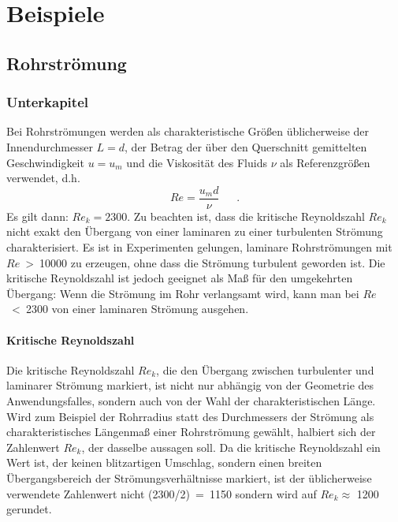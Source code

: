 \chapter{Beispiele}
\label{sec:Beispiele}
\section{Rohrströmung}
\label{sec:Rohrstroemung}
\subsection{Unterkapitel}
\label{sec:Unterkapitel}

Bei Rohrströmungen werden als charakteristische Größen üblicherweise der Innendurchmesser $L = d$, der Betrag der über den Querschnitt gemittelten Geschwindigkeit $u = u_m$ und die Viskosität des Fluids $\nu$ als Referenzgrößen verwendet, d.h.
\begin{equation}
	Re = \frac{u_m d}{\nu}  \ \ \ \ \ \ \ \mbox{.}
\end{equation}
Es gilt dann: $Re_k = 2300$.
Zu beachten ist, dass die kritische Reynoldszahl $Re_{k}$ nicht exakt den Übergang von einer laminaren zu einer turbulenten Strömung charakterisiert. Es ist in Experimenten gelungen, laminare Rohrströmungen mit $Re$ > 10000 zu erzeugen, ohne dass die Strömung turbulent geworden ist. Die kritische Reynoldszahl ist jedoch geeignet als Maß für den umgekehrten Übergang: Wenn die Strömung im Rohr verlangsamt wird, kann man bei $Re$ < 2300 von einer laminaren Strömung ausgehen. 
\subsubsection{Kritische Reynoldszahl}
\label{sec:KritischeReynoldszahl}
Die kritische Reynoldszahl $Re_k$, die den Übergang zwischen turbulenter und laminarer Strömung markiert, ist nicht nur abhängig von der Geometrie des Anwendungsfalles, sondern auch von der Wahl der charakteristischen Länge. Wird zum Beispiel der Rohrradius statt des Durchmessers der Strömung als charakteristisches Längenmaß einer Rohrströmung gewählt, halbiert sich der Zahlenwert $Re_k$, der dasselbe aussagen soll. Da die kritische Reynoldszahl ein Wert ist, der keinen blitzartigen Umschlag, sondern einen breiten Übergangsbereich der Strömungsverhältnisse markiert, ist der üblicherweise verwendete Zahlenwert nicht (2300/2) = 1150 sondern wird auf $Re_k \approx$ 1200 gerundet.
